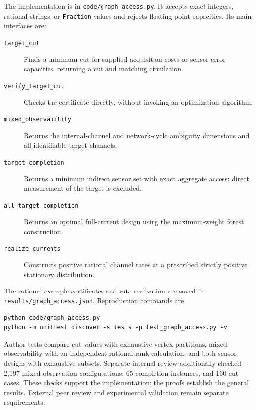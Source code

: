 The implementation is in \texttt{code/graph\_access.py}. It accepts exact
integers, rational strings, or \texttt{Fraction} values and rejects floating
point capacities. Its main interfaces are:
\begin{description}
 \item[\texttt{target\_cut}] Finds a minimum cut for supplied acquisition
 costs or sensor-error capacities, returning a cut and matching circulation.
 \item[\texttt{verify\_target\_cut}] Checks the certificate directly,
 without invoking an optimization algorithm.
 \item[\texttt{mixed\_observability}] Returns the internal-channel and
 network-cycle ambiguity dimensions and all identifiable target channels.
 \item[\texttt{target\_completion}] Returns a minimum indirect sensor set
 with exact aggregate access; direct measurement of the target is excluded.
 \item[\texttt{all\_target\_completion}] Returns an optimal full-current
 design using the maximum-weight forest construction.
 \item[\texttt{realize\_currents}] Constructs positive rational channel
 rates at a prescribed strictly positive stationary distribution.
\end{description}
The rational example certificates and rate realization are saved in
\texttt{results/graph\_access.json}. Reproduction commands are
\begin{verbatim}
python code/graph_access.py
python -m unittest discover -s tests -p test_graph_access.py -v
\end{verbatim}

Author tests compare cut values with exhaustive vertex partitions, mixed
observability with an independent rational rank calculation, and both sensor
designs with exhaustive subsets. Separate internal review additionally checked
2,197 mixed-observation configurations, 65 completion instances, and 160 cut
cases. These checks support the implementation; the proofs establish the
general results. External peer review and experimental validation remain
separate requirements.

